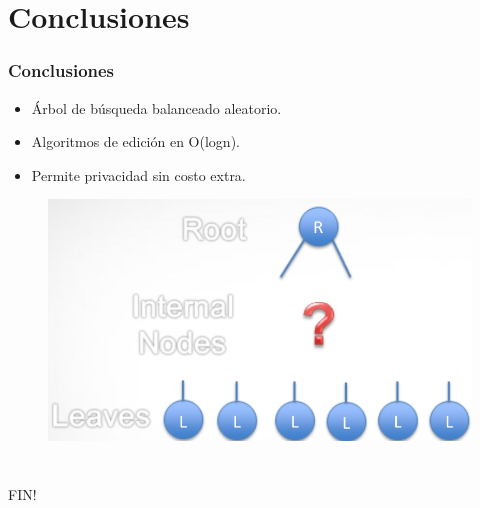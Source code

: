 \documentclass[10pt,handout]{beamer}
\begin{document}
\section{Conclusiones}
\begin{frame}
\frametitle{Conclusiones}
\begin{itemize}
  \item Árbol de búsqueda balanceado aleatorio.
  \item Algoritmos de edición en O(logn).
  \item Permite privacidad sin costo extra.
\end{itemize}
\begin{figure}[h!]
    \centering
    \includegraphics[scale=0.3]{conc.jpg}
\end{figure}


\end{frame}



\section{}
\begin{frame}
\frametitle{}

\huge
\centering
FIN!
\end{frame}

\end{document}
